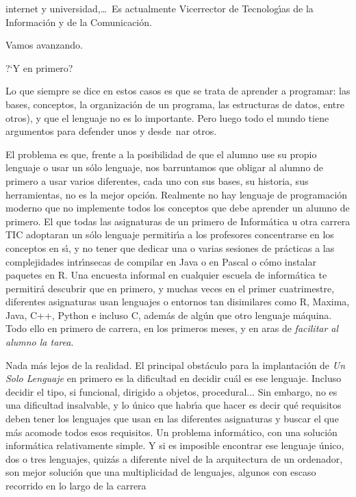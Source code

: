 \documentclass[twoside,10pt]{article}
\begin{document}
\begin{multicols}{2}
{{\begin{window}
		internet y universidad,\ldots\ 
		Es actualmente Vicerrector de Tecnolog\'{\i}as de la Informaci\'{o}n y
de la Comunicaci\'{o}n.   
		\end{window}}}

 

Vamos avanzando.

?`Y en primero? 

Lo que siempre se dice en estos casos es que se trata de aprender a
programar: las bases, conceptos, la organizaci\'on de un programa, las
estructuras de datos, entre otros), y que el lenguaje no es lo importante.
Pero luego todo el mundo tiene argumentos para defender unos
y desde~nar otros.

El problema es que, frente a la posibilidad de que el alumno use su
propio lenguaje o usar un s\'olo lenguaje, nos barruntamos que obligar
al alumno de primero a usar varios diferentes, cada uno con
sus bases, su historia, sus herramientas, no es la mejor opci\'on. 
Realmente no hay lenguaje de programaci\'on moderno que no
implemente todos los conceptos que debe aprender un alumno de
primero. El que todas las asignaturas de un primero de Inform\'atica u
otra carrera TIC adoptaran un s\'olo lenguaje permitir\'{\i}a a los profesores
concentrarse en los conceptos en s\'{\i}, y no tener que dedicar una o
varias sesiones de pr\'acticas a las complejidades intr\'{\i}nsecas de
compilar en Java o en Pascal o c\'omo instalar paquetes en R. Una
encuesta informal en cualquier escuela de inform\'atica te permitir\'a
descubrir que en primero, y muchas veces en el primer cuatrimestre,
diferentes asignaturas usan lenguajes o entornos tan disimilares como
R, Maxima, Java, C++, Python e incluso C, adem\'as de alg\'un
que otro lenguaje m\'aquina. Todo ello en primero de carrera, en los
primeros meses, y en aras de {\em facilitar al alumno la tarea}. 

Nada m\'as lejos de la realidad. El principal obst\'aculo para la
implantaci\'on de {\em Un Solo Lenguaje} en primero es la dificultad
en decidir cu\'al es ese lenguaje. Incluso decidir el tipo, si
funcional, dirigido a objetos, procedural... Sin embargo, no es una
dificultad insalvable, y lo \'unico que habr\'{\i}a que hacer es decir qu\'e
requisitos deben tener los lenguajes que usan en las diferentes
asignaturas y buscar el que m\'as acomode todos esos requisitos. 
Un problema inform\'atico, con una soluci\'on inform\'atica relativamente
simple. Y si es imposible encontrar ese lenguaje \'unico, dos o tres
lenguajes, quiz\'as a diferente nivel de la arquitectura de un
ordenador, son mejor soluci\'on que una multiplicidad de lenguajes,
algunos con escaso recorrido en lo largo de la carrera


\end{multicols}
\end{document}
